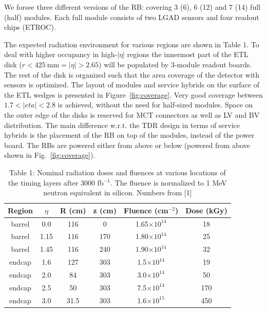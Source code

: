 \documentclass[11pt]{article}
\begin{document}
We forsee three different versions of the RB: covering 3 (6), 6 (12) and 7 (14) full (half) modules.
Each full module consists of two LGAD sensors and four readout chips (ETROC).

The expected radiation environment for various regions are shown in Table 1.
To deal with higher occupancy in high-$|\eta|$ regions the innermost part of the ETL disk ($r<425~\mathrm{mm} = |\eta|>2.65$) will be populated by 3-module readout boards.
The rest of the disk is organized such that the area coverage of the detector with sensors is optimized.
The layout of modules and service hybrids on the surface of the ETL wedges is presented in Figure~\ref{fig:coverage}.
Very good coverage between $1.7<|eta|<2.8$ is achieved, without the need for half-sized modules.
Space on the outer edge of the disks is reserved for MCT connectors as well as LV and BV distribution.
The main difference w.r.t. the TDR design in terms of service hybrids is the placement of the RB on top of the modules, instead of the power board.
The RBs are powered either from above or below (powered from above shown in Fig.~\ref{fig:coverage}).

\begin{table}
  \centering
  \caption{Table 1: Nominal radiation doses and fluences at various locations of the timing layers after 3000 fb$^{-1}$. The fluence is normalized to 1 MeV neutron equivalent in silicon.
  Numbers from [1]}
  \label{table:radiationField}
  \begin{tabular}{ c c c c c c }
    Region & $\eta$ & R (cm) & z (cm) & Fluence (cm$^{-2}$) & Dose (kGy) \\
    \midrule
    barrel & 0.0    & 116    & 0      & 1.65$\times 10^{14}$ & 18         \\
    barrel & 1.15   & 116    & 170    & 1.80$\times 10^{14}$ & 25         \\
    barrel & 1.45   & 116    & 240    & 1.90$\times 10^{14}$ & 32         \\
    endcap & 1.6    & 127    & 303    & 1.5$\times 10^{14}$ & 19         \\
    endcap & 2.0    & 84     & 303    & 3.0$\times 10^{14}$ & 50         \\
    endcap & 2.5    & 50     & 303    & 7.5$\times 10^{14}$ & 170        \\
    endcap & 3.0    & 31.5   & 303    & 1.6$\times 10^{15}$ & 450        \\
  \end{tabular}
\end{table}
\end{document}
